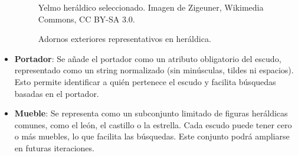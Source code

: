 \begin{itemize}
\begin{figure}[h!]
\begin{minipage}{0.3\textwidth}
        \caption{Yelmo heráldico seleccionado. Imagen de Zigeuner, Wikimedia Commons, CC BY-SA 3.0.}
    \end{minipage}

    \caption{Adornos exteriores representativos en heráldica.}
    \label{fig:adornos_exteriores}
\end{figure}


    \item \textbf{Portador}: Se añade el portador como un atributo obligatorio del escudo, representado
    como un string normalizado (sin minúsculas, tildes ni espacios). Esto permite identificar a quién 
    pertenece el escudo y facilita búsquedas basadas en el portador.
    \item \textbf{Mueble}: Se representa como un subconjunto limitado de figuras heráldicas comunes,
    como el león, el castillo o la estrella. Cada escudo puede tener cero o más muebles, lo que facilita
    las búsquedas. Este conjunto podrá ampliarse en futuras iteraciones.

    \begin{figure}[h!]
        \centering


\end{figure}
\end{itemize}
